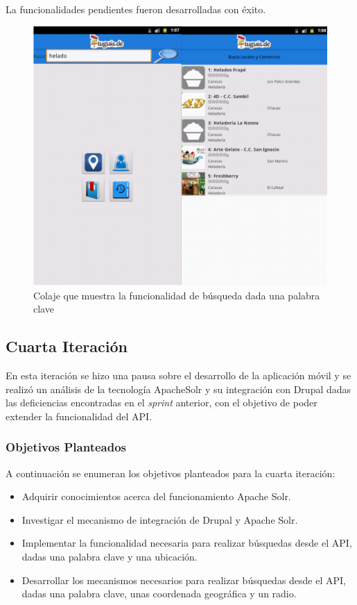 La funcionalidades pendientes fueron desarrolladas con éxito. 

\begin{figure}[h]
	\begin{center}
		\includegraphics[scale=0.5]{imagenes/search_keyword.png}
	\end{center}
	\caption{
		\label{img:keyword}
		Colaje que muestra la funcionalidad de búsqueda dada una palabra clave
	}
\end{figure}

\subsection{Cuarta Iteración}

En esta iteración se hizo una pausa sobre el desarrollo de la aplicación móvil y se realizó un análisis de la tecnología ApacheSolr y su integración con Drupal dadas las deficiencias encontradas en el \textit{sprint} anterior, con el objetivo de poder extender la funcionalidad del API. 
\subsubsection{Objetivos Planteados} 
A continuación se enumeran los objetivos planteados para la cuarta iteración:
\begin{itemize}

\item Adquirir conocimientos acerca del funcionamiento Apache Solr.
\item Investigar el mecanismo de integración de Drupal y Apache Solr.
\item Implementar la funcionalidad necesaria para realizar búsquedas desde el API, dadas una palabra clave y una ubicación.
\item Desarrollar los mecanismos necesarios para realizar búsquedas desde el API, dadas una palabra clave, unas coordenada geográfica y un radio.

\end{itemize}

